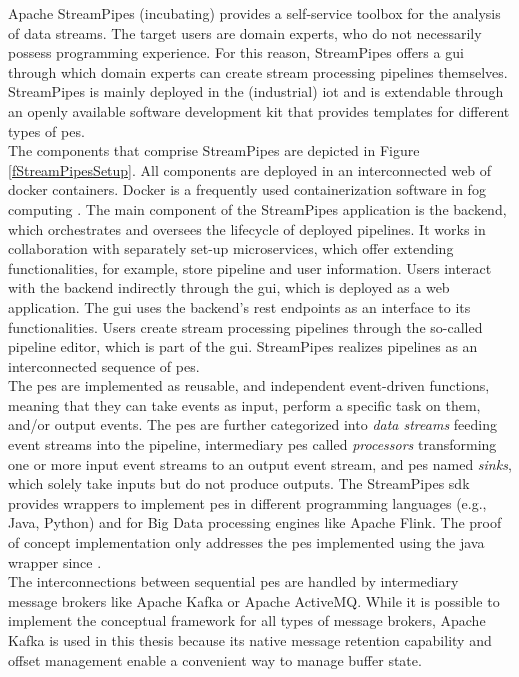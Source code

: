 Apache StreamPipes (incubating) provides a self-service toolbox for the analysis of data streams. The target users are domain experts, who do not necessarily possess programming experience. For this reason, StreamPipes offers a \gls{gui} through which domain experts can create stream processing pipelines themselves. StreamPipes is mainly deployed in the (industrial) \gls{iot} and is extendable through an openly available software development kit that provides templates for different types of \gls{pe}s.\\
The components that comprise StreamPipes are depicted in Figure \ref{fStreamPipesSetup}. All components are deployed in an interconnected web of docker containers. Docker is a frequently used containerization software in fog computing \cite{Brogi.2018}. The main component of the StreamPipes application is the backend, which orchestrates and oversees the lifecycle of deployed pipelines. It works in collaboration with separately set-up microservices, which offer extending functionalities, for example, store pipeline and user information. Users interact with the backend indirectly through the \gls{gui}, which is deployed as a web application. The \gls{gui} uses the backend's \gls{rest} endpoints as an interface to its functionalities. Users create stream processing pipelines through the so-called pipeline editor, which is part of the \gls{gui}. StreamPipes realizes pipelines as an interconnected sequence of \gls{pe}s.\\
The \gls{pe}s are implemented as reusable, and independent event-driven functions, meaning that they can take events as input, perform a specific task on them, and/or output events. The \gls{pe}s are further categorized into \textit{data streams} feeding event streams into the pipeline, intermediary \gls{pe}s called \textit{processors} transforming one or more input event streams to an output event stream, and \gls{pe}s named \textit{sinks}, which solely take inputs but do not produce outputs. The StreamPipes \gls{sdk} provides wrappers to implement \gls{pe}s in different programming languages (e.g., Java, Python) and for Big Data processing engines like Apache Flink. The proof of concept implementation only addresses the \gls{pe}s implemented using the java wrapper since .\\
The interconnections between sequential \gls{pe}s are handled by intermediary message brokers like Apache Kafka or Apache ActiveMQ. While it is possible to implement the conceptual framework for all types of message brokers, Apache Kafka is used in this thesis because its native message retention capability and offset management enable a convenient way to manage buffer state.

